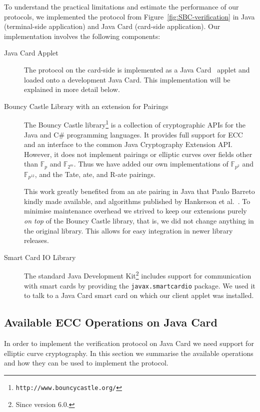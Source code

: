 To understand the practical limitations and estimate the performance of our
protocols, we implemented the protocol from Figure~\ref{fig:SBC-verification}
in Java (terminal-side application) and Java Card (card-side application).
Our implementation involves the following components:
\begin{description}
  \item[Java Card Applet] The protocol on the card-side is implemented as a
    Java Card~\cite{Chen00} applet and loaded onto a development Java Card.
    This implementation will be explained in more detail below.
  \item[Bouncy Castle Library with an extension for Pairings] The Bouncy Castle
    library\footnote{\texttt{http://www.bouncycastle.org/}} is a collection of
    cryptographic APIs for the Java and C\# programming languages. It provides
    full support for ECC and an interface to the common Java Cryptography
    Extension API. However, it does not implement pairings or elliptic curves
    over fields other than $\mathbb{F}_p$ and $\mathbb{F}_{2^m}$. Thus we have
    added our own implementations of $\mathbb{F}_{p^2}$ and
    $\mathbb{F}_{p^{12}}$, and the Tate, ate, and R-ate pairings.

    This work greatly benefited from an ate pairing in Java that Paulo Barreto
    kindly made available, and algorithms published by Hankerson et
    al.~\cite{HankersonMS09}. To minimise maintenance overhead we strived to
    keep our extensions purely \emph{on top} of the Bouncy Castle library, that
    is, we did not change anything in the original library. This allows for easy
    integration in newer library releases.
  \item[Smart Card IO Library] The standard Java Development
    Kit\footnote{Since version 6.0.} includes support for communication with
    smart cards by providing the \texttt{javax.smartcardio} package. We used it
    to talk to a Java Card smart card on which our client applet was installed.
\end{description}

\subsection{Available ECC Operations on Java Card}

In order to implement the verification protocol on Java Card we need support for
elliptic curve cryptography. In this section we summarise the available
operations and how they can be used to implement the protocol.

